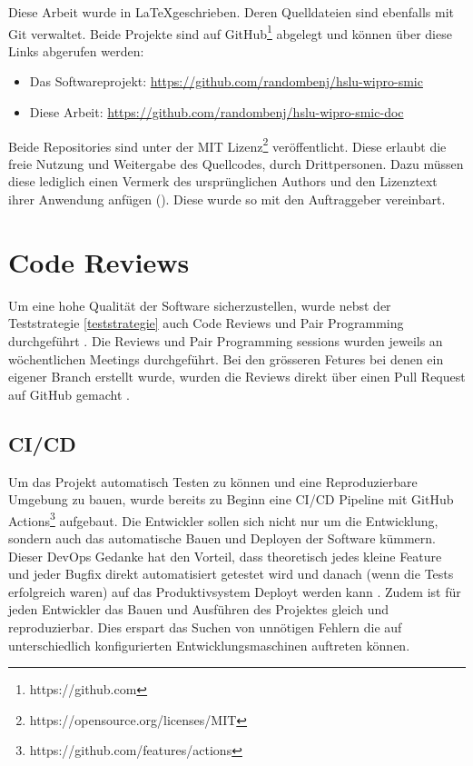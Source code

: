 Diese Arbeit wurde in \LaTeX geschrieben. Deren Quelldateien sind ebenfalls mit Git verwaltet.
Beide Projekte sind auf GitHub\footnote{https://github.com} abgelegt und können über diese Links abgerufen werden:

\begin{itemize}
    \item Das Softwareprojekt: \url{https://github.com/randombenj/hslu-wipro-smic}
    \item Diese Arbeit: \url{https://github.com/randombenj/hslu-wipro-smic-doc}
\end{itemize}

Beide Repositories sind unter der MIT Lizenz\footnote{https://opensource.org/licenses/MIT} veröffentlicht.
Diese erlaubt die freie Nutzung und Weitergabe des Quellcodes, durch Drittpersonen.
Dazu müssen diese lediglich einen Vermerk des ursprünglichen Authors und den Lizenztext ihrer Anwendung anfügen (\parencite{mit_licence}).
Diese wurde so mit den Auftraggeber vereinbart.

\section{Code Reviews}

Um eine hohe Qualität der Software sicherzustellen, wurde nebst der Teststrategie \ref{teststrategie}
auch Code Reviews und Pair Programming durchgeführt \parencite{fu2017code}.
Die Reviews und Pair Programming sessions wurden jeweils an wöchentlichen
Meetings durchgeführt.
Bei den grösseren Fetures bei denen ein eigener Branch erstellt wurde, wurden die
Reviews direkt über einen Pull Request auf GitHub gemacht \parencite{github_flow_docs_2021}.

\subsection{\ac{CI/CD}}

Um das Projekt automatisch Testen zu können und eine Reproduzierbare Umgebung zu bauen,
wurde bereits zu Beginn eine \ac{CI/CD} Pipeline mit GitHub Actions\footnote{https://github.com/features/actions}
aufgebaut.
Die Entwickler sollen sich nicht nur um die Entwicklung, sondern auch das automatische Bauen und Deployen der
Software kümmern. Dieser DevOps Gedanke hat den Vorteil, dass
theoretisch jedes kleine Feature und jeder Bugfix direkt automatisiert getestet
wird und danach (wenn die Tests erfolgreich waren) auf das Produktivsystem
Deployt werden kann \parencite{what_is_devops}.
Zudem ist für jeden Entwickler das Bauen und Ausführen des Projektes gleich und
reproduzierbar. Dies erspart das Suchen von unnötigen Fehlern die auf unterschiedlich
konfigurierten Entwicklungsmaschinen auftreten können.
